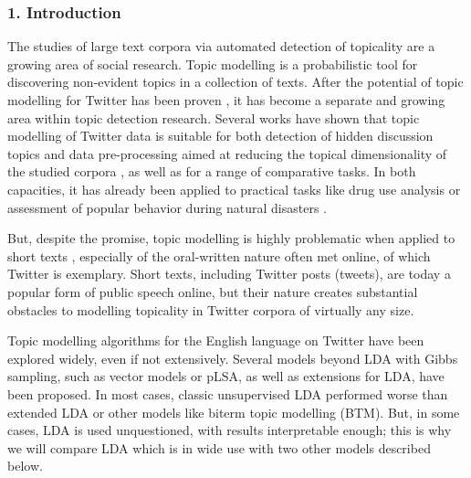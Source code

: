 \subsubsection{1. Introduction}

The studies of large text corpora via automated detection of topicality are a growing area of social research. Topic modelling is a probabilistic tool for discovering non-evident topics in a collection of texts. After the potential of topic modelling for Twitter has been proven \cite{RamageDumaisLiebling}, it has become a separate and growing area within topic detection research. Several works have shown that topic modelling of Twitter data is suitable for both detection of hidden discussion topics and data pre-processing aimed at reducing the topical dimensionality of the studied corpora \cite{BlekanovTarasovMaksimov,KoltsovaKoltcov}, as well as for a range of comparative tasks. In both capacities, it has already been applied to practical tasks like drug use analysis \cite{JonnagaddalaJueDai} or assessment of popular behavior during natural disasters \cite{LigutomOrioRamacho,MacedaLlovidoPalaoag}.

But, despite the promise, topic modelling is highly problematic when applied to short texts \cite{MazaruraDeWaalKanifer}, especially of the oral-written nature \cite{Lutovinova} often met online, of which Twitter is exemplary. Short texts, including Twitter posts (tweets), are today a popular form of public speech online, but their nature creates substantial obstacles to modelling topicality in Twitter corpora of virtually any size.

Topic modelling algorithms for the English language on Twitter have been explored widely, even if not extensively. Several models beyond LDA with Gibbs sampling, such as vector models or pLSA, as well as extensions for LDA, have been proposed. In most cases, classic unsupervised LDA performed worse than extended LDA or other models like biterm topic modelling (BTM). But, in some cases, LDA is used unquestioned, with results interpretable enough; this is why we will compare LDA which is in wide use with two other models described below.

